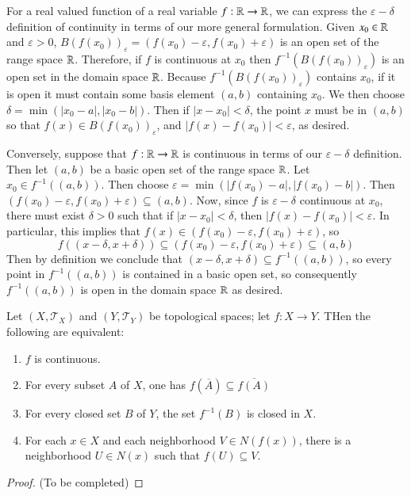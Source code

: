 \documentclass[12pt, a4paper, oneside, openright, titlepage]{book}
\begin{document}
\begin{example}
    For a real valued function of a real variable $f:\mathbb R\rightarrow \mathbb R$, we can express the $\varepsilon-\delta$ definition of continuity in terms of our more general formulation. Given $x_0 \in \mathbb R$ and $\varepsilon > 0$, $B(f(x_0))_{\varepsilon} = (f(x_0) - \varepsilon, f(x_0) + \varepsilon)$ is an open set of the range space $\mathbb R$. Therefore, if $f$ is continuous at $x_0$ then $f^{-1}(B(f(x_0))_{\varepsilon})$ is an open set in the domain space $\mathbb R$. Because $f^{-1}(B(f(x_0))_{\varepsilon})$ contains $x_0$, if it is open it must contain some basis element $(a,b)$ containing $x_0$. We then choose $\delta = \min(|x_0 - a|, |x_0 - b|)$. Then if $|x-x_0| < \delta$, the point $x$ must be in $(a,b)$ so that $f(x) \in B(f(x_0))_{\varepsilon}$, and $|f(x)-f(x_0)| < \varepsilon$, as desired.


    Conversely, suppose that $f:\mathbb R\rightarrow \mathbb R$ is continuous in terms of our $\varepsilon-\delta$ definition. Then let $(a,b)$ be a basic open set of the range space $\mathbb R$. Let $x_0 \in f^{-1}((a,b))$. Then choose $\varepsilon = \min(|f(x_0) - a|, |f(x_0) - b|)$. Then $(f(x_0) - \varepsilon, f(x_0) +\varepsilon) \subseteq (a,b)$. Now, since $f$ is $\varepsilon-\delta$ continuous at $x_0$, there must exist $\delta > 0$ such that if $|x - x_0| < \delta$, then $|f(x) - f(x_0)| < \varepsilon$. In particular, this implies that $f(x) \in (f(x_0)-\varepsilon,f(x_0)+\varepsilon)$, so $$f((x-\delta,x+\delta)) \subseteq (f(x_0)-\varepsilon,f(x_0)+\varepsilon) \subseteq (a,b)$$ Then by definition we conclude that $(x-\delta,x+\delta) \subseteq f^{-1}((a,b))$, so every point in $f^{-1}((a,b))$ is contained in a basic open set, so consequently $f^{-1}((a,b))$ is open in the domain space $\mathbb R$ as desired.
\end{example}



\begin{theorem}
    Let $(X,\mathcal{T}_X)$ and $(Y,\mathcal{T}_Y)$ be topological spaces; let $f:X\rightarrow Y$. THen the following are equivalent: \begin{enumerate}
        \item $f$ is continuous.
        \item For every subset $A$ of $X$, one has $f(\overline{A}) \subseteq \overline{f(A)}$
        \item For every closed set $B$ of $Y$, the set $f^{-1}(B)$ is closed in $X$.
        \item For each $x \in X$ and each neighborhood $V \in N(f(x))$, there is a neighborhood $U \in N(x)$ such that $f(U) \subseteq V$.
    \end{enumerate}
\end{theorem}
\begin{proof}
    (To be completed)
\end{proof}
\end{document}
